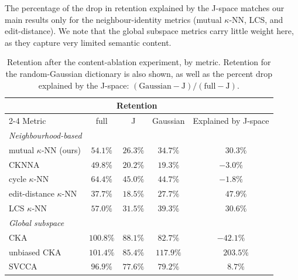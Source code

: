 \documentclass{article}
\begin{document}
The percentage of the drop in retention explained by the J-space matches our main results only for the neighbour-identity metrics (mutual $\kappa$-NN, LCS, and edit-distance). We note that the global subspace metrics carry little weight here, as they capture very limited semantic content.  
\begin{table}
  \centering
  \small
  \setlength{\tabcolsep}{5pt}
  \caption{Retention after the content-ablation experiment, by metric. Retention for the random-Gaussian dictionary is also shown, as well as the percent drop explained by the J-space: $(\text{Gaussian}-\text{J})/(\text{full}-\text{J})$.}
  \label{tab:metriccontent}
  \begin{tabular}{lcccc}
    \toprule
    & \multicolumn{3}{c}{Retention} &  \\
    \cmidrule(lr){2-4}
    Metric & full & J & Gaussian & Explained by J-space \\
    \midrule
    \multicolumn{5}{l}{\emph{Neighbourhood-based}} \\
    mutual $\kappa$-NN (ours)  & $54.1\%$ & $26.3\%$ & $34.7\%$ & $\phantom{-}30.3\%$ \\
    CKNNA                      & $49.8\%$ & $20.2\%$ & $19.3\%$ & $-3.0\%$ \\
    cycle $\kappa$-NN          & $64.4\%$ & $45.0\%$ & $44.7\%$ & $-1.8\%$ \\
    edit-distance $\kappa$-NN  & $37.7\%$ & $18.5\%$ & $27.7\%$ & $\phantom{-}47.9\%$ \\
    LCS $\kappa$-NN            & $57.0\%$ & $31.5\%$ & $39.3\%$ & $\phantom{-}30.6\%$ \\
    \midrule
    \multicolumn{5}{l}{\emph{Global subspace}} \\
    CKA                        & $100.8\%$ & $88.1\%$ & $82.7\%$ & $-42.1\%$ \\
    unbiased CKA               & $101.4\%$ & $85.4\%$ & $117.9\%$ & $\phantom{-}203.5\%$ \\
    SVCCA                      & $96.9\%$ & $77.6\%$ & $79.2\%$ & $\phantom{-}8.7\%$ \\
    \bottomrule
  \end{tabular}
\end{table}
\clearpage

\end{document}
